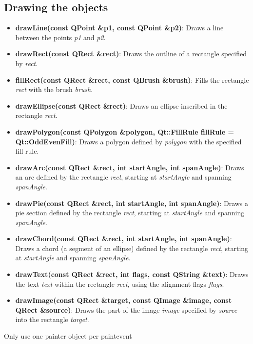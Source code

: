 \documentclass{report}
\begin{document}
    \bigbreak \noindent 
    \subsection{Drawing the objects}
    \bigbreak \noindent 
    \begin{itemize}
        \item \textbf{drawLine(const QPoint \&p1, const QPoint \&p2)}: Draws a line between the points \textit{p1} and \textit{p2}.
        \item \textbf{drawRect(const QRect \&rect)}: Draws the outline of a rectangle specified by \textit{rect}.
        \item \textbf{fillRect(const QRect \&rect, const QBrush \&brush)}: Fills the rectangle \textit{rect} with the brush \textit{brush}.
        \item \textbf{drawEllipse(const QRect \&rect)}: Draws an ellipse inscribed in the rectangle \textit{rect}.
        \item \textbf{drawPolygon(const QPolygon \&polygon, Qt::FillRule fillRule = Qt::OddEvenFill)}: Draws a polygon defined by \textit{polygon} with the specified fill rule.
        \item \textbf{drawArc(const QRect \&rect, int startAngle, int spanAngle)}: Draws an arc defined by the rectangle \textit{rect}, starting at \textit{startAngle} and spanning \textit{spanAngle}.
        \item \textbf{drawPie(const QRect \&rect, int startAngle, int spanAngle)}: Draws a pie section defined by the rectangle \textit{rect}, starting at \textit{startAngle} and spanning \textit{spanAngle}.
        \item \textbf{drawChord(const QRect \&rect, int startAngle, int spanAngle)}: Draws a chord (a segment of an ellipse) defined by the rectangle \textit{rect}, starting at \textit{startAngle} and spanning \textit{spanAngle}.
        \item \textbf{drawText(const QRect \&rect, int flags, const QString \&text)}: Draws the text \textit{text} within the rectangle \textit{rect}, using the alignment flags \textit{flags}.
        \item \textbf{drawImage(const QRect \&target, const QImage \&image, const QRect \&source)}: Draws the part of the image \textit{image} specified by \textit{source} into the rectangle \textit{target}.
    \end{itemize}

    \bigbreak \noindent 
    \begin{notebox}
       Only use one painter object per paintevent 
    \end{notebox}
    
\end{document}
